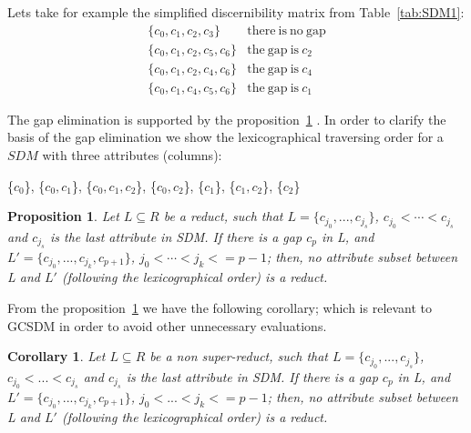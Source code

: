 \documentclass[authoryear,11pt]{elsarticle}
\newtheorem{proposition}{Proposition}
\newtheorem{proof}{Proof}
\newtheorem{corollary}{Corollary}
\begin{document}
	Lets take for example the simplified discernibility matrix from Table~\ref{tab:SDM1}:
	$$\begin{array}{ll}
	\lbrace c_0,c_1,c_2,c_3\rbrace 		& \mathrm{there~is~no~gap}\\
	\lbrace c_0,c_1,c_2,c_5,c_6\rbrace 	& \mathrm{the~gap~is~} c_2\\
	\lbrace c_0,c_1,c_2,c_4,c_6\rbrace 	& \mathrm{the~gap~is~} c_4\\
	\lbrace c_0,c_1,c_4,c_5,c_6\rbrace 	& \mathrm{the~gap~is~} c_1
	\end{array}$$
	
	
	The gap elimination is supported by the proposition~\ref{prop:gap} \citep{Santiesteban03}. In order to clarify
	the basis of the gap elimination we show the lexicographical traversing order for a $SDM$ with three
	attributes (columns):
	
	\{$c_0$\}, \{$c_0,c_1$\}, \{$c_0,c_1,c_2$\}, \{$c_0,c_2$\}, \{$c_1$\}, \{$c_1,c_2$\}, \{$c_2$\}
		
	\begin{proposition}\label{prop:gap} 
		Let $L \subseteq R$ be a reduct, such that $L = \lbrace c_{j_0},...,c_{j_s}\rbrace$, $c_{j_0}<\cdots
		<c_{j_s}$ and $c_{j_s}$ is the last attribute in SDM. If there is a gap $c_p$ in L, and $L' = \lbrace
		c_{j_0},...,c_{j_k},c_{p+1}\rbrace$, $j_0<\cdots <j_k<=p-1$; then, no attribute subset between L and $L'$
		(following the lexicographical order) is a reduct.
	\end{proposition}	
%	
	
	From the proposition~\ref{prop:gap} we have the following corollary; which is relevant to GCSDM in order to
	avoid other unnecessary evaluations.
	
	\begin{corollary}\label{coro:gap} 
		Let $L \subseteq R$ be a non super-reduct, such that $L = \lbrace c_{j_0},...,c_{j_s}\rbrace$, 
		$c_{j_0}<...<c_{j_s}$ and $c_{j_s}$ is the last attribute in SDM. If there is a gap $c_p$ in L, and 
		$L' = \lbrace c_{j_0},...,c_{j_k},c_{p+1}\rbrace$, $j_0<...<j_k<=p-1$; then, no attribute 
		subset between L and $L'$ (following the lexicographical order) is a reduct.
	\end{corollary}
	
\end{document}
